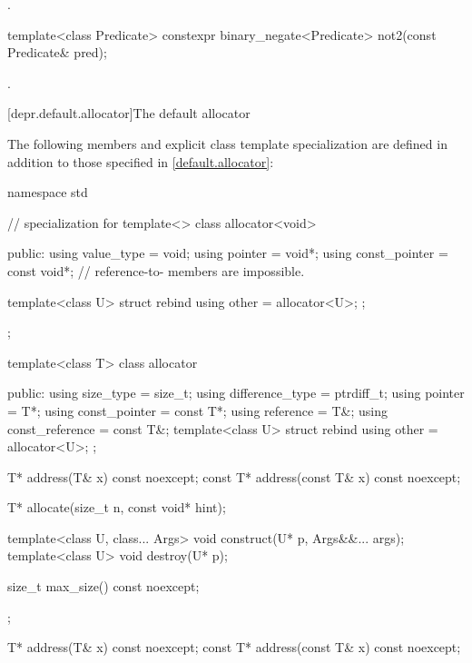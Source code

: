 \begin{itemdescr}
\pnum \returns {}.
\end{itemdescr}

%
\begin{itemdecl}
template<class Predicate>
  constexpr binary_negate<Predicate> not2(const Predicate& pred);
\end{itemdecl}

\begin{itemdescr}
\pnum \returns {}.
\end{itemdescr}

[depr.default.allocator]{The default allocator}

\pnum
The following members and explicit class template specialization are defined in
addition to those specified in \ref{default.allocator}:

%
\begin{codeblock}
namespace std {
  // specialization for 
  template<> class allocator<void> {
  public:
    using value_type    = void;
    using pointer       = void*;
    using const_pointer = const void*;
    // reference-to- members are impossible.

    template<class U> struct rebind { using other = allocator<U>; };
  };

  template<class T> class allocator {
   public:
    using size_type       = size_t;
    using difference_type = ptrdiff_t;
    using pointer         = T*;
    using const_pointer   = const T*;
    using reference       = T&;
    using const_reference = const T&;
    template<class U> struct rebind { using other = allocator<U>; };

    T* address(T& x) const noexcept;
    const T* address(const T& x) const noexcept;

    T* allocate(size_t n, const void* hint);

    template<class U, class... Args>
      void construct(U* p, Args&&... args);
    template<class U>
      void destroy(U* p);

    size_t max_size() const noexcept;
  };
}
\end{codeblock}

%
\begin{itemdecl}
T* address(T& x) const noexcept;
const T* address(const T& x) const noexcept;
\end{itemdecl}

